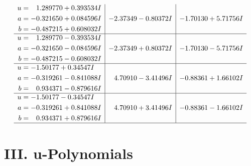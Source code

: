 \documentclass[1p]{elsarticle_modified}
\theoremstyle{definition}
\begin{document}
$$\begin{array}{c|c|c}
\begin{aligned}
u &= \phantom{-}1.289770 + 0.393534 I \\
a &= -0.321650 + 0.084596 I \\
b &= -0.487215 + 0.608032 I\end{aligned}
 & -2.37349 - 0.80372 I & -1.70130 + 5.71756 I \\ \hline\begin{aligned}
u &= \phantom{-}1.289770 - 0.393534 I \\
a &= -0.321650 - 0.084596 I \\
b &= -0.487215 - 0.608032 I\end{aligned}
 & -2.37349 + 0.80372 I & -1.70130 - 5.71756 I \\ \hline\begin{aligned}
u &= -1.50177 + 0.34547 I \\
a &= -0.319261 - 0.841088 I \\
b &= \phantom{-}0.934371 - 0.879616 I\end{aligned}
 & \phantom{-}4.70910 - 3.41496 I & -0.88361 + 1.66102 I \\ \hline\begin{aligned}
u &= -1.50177 - 0.34547 I \\
a &= -0.319261 + 0.841088 I \\
b &= \phantom{-}0.934371 + 0.879616 I\end{aligned}
 & \phantom{-}4.70910 + 3.41496 I & -0.88361 - 1.66102 I\\
 \hline 
 \end{array}$$\newpage
\newpage\renewcommand{\arraystretch}{1}
\centering \section*{ III. u-Polynomials}
\end{document}
